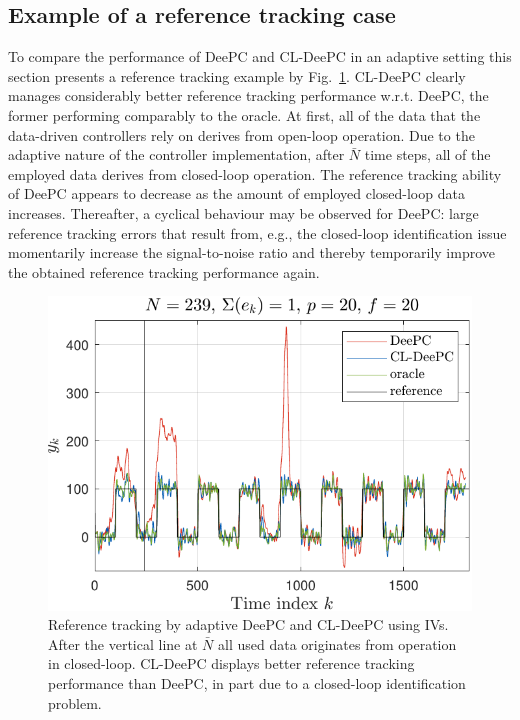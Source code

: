 \subsection{Example of a reference tracking case}
\noindent To compare the performance of \ac{DeePC} and \ac{CL-DeePC} in an adaptive setting this section presents a reference tracking example by Fig.~\ref{fig:CL_Problem_Solution}. \ac{CL-DeePC} clearly manages considerably better reference tracking performance w.r.t. \ac{DeePC}, the former performing comparably to the oracle. At first, all of the data that the data-driven controllers rely on derives from open-loop operation. Due to the adaptive nature of the controller implementation, after $\bar{N}$ time steps, all of the employed data derives from closed-loop operation. The reference tracking ability of \ac{DeePC} appears to decrease as the amount of employed closed-loop data increases. Thereafter, a cyclical behaviour may be observed for \ac{DeePC}: large reference tracking errors that result from, e.g., the closed-loop identification issue momentarily increase the signal-to-noise ratio and thereby temporarily improve the obtained reference tracking performance again.
\begin{figure}[b!]
\begin{center}%
\includegraphics[width=\columnwidth]{results/figures/DeePC_CL_ID_issue_Re_1_Nbar_239_p_20_f_20_Ru_1_Rdu_0_Q_100_R_0_dR_10.pdf}    %
\caption{Reference tracking by adaptive \ac{DeePC} and \ac{CL-DeePC} using \ac{IVs}. After the vertical line at $\bar{N}$ all used data originates from operation in closed-loop. \ac{CL-DeePC} displays better reference tracking performance than \ac{DeePC}, in part due to a closed-loop identification problem.}%
\label{fig:CL_Problem_Solution}%
\end{center}%
\end{figure}%

